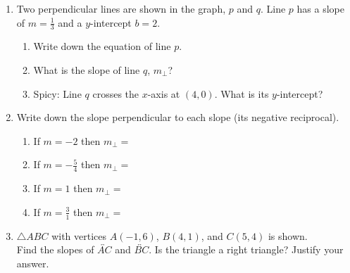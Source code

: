 \documentclass[12pt, twoside]{article}
\begin{document}
\begin{enumerate}
\newpage
\item Two perpendicular lines are shown in the graph, $p$ and $q$. Line $p$ has a slope of $\displaystyle m = \frac{1}{3}$ and a $y$-intercept $b=2$.
\begin{multicols}{2}
    \begin{enumerate}[itemsep=1cm]
      \item Write down the equation of line $p$.
      \item What is the slope of line $q$, $m_\perp$?
      \item Spicy: Line $q$ crosses the $x$-axis at $(4,0)$. What is its $y$-intercept?
      \end{enumerate}
    \begin{flushright}
    \end{flushright}
\end{multicols}

\newpage
\item Write down the slope perpendicular to each slope (its negative reciprocal).
\begin{enumerate}[itemsep=0.9cm]
  \item If $m = -2$ then $m_{\perp}=$
  \item If $\displaystyle m = -\frac{5}{4}$ then $m_{\perp}=$
  \item If $m = 1$ then $m_{\perp}=$
  \item If $\displaystyle m = \frac{3}{1}$ then $m_{\perp}=$
\end{enumerate}

\newpage
\item $\triangle ABC$ with vertices $A(-1,6)$, $B(4,1)$, and $C(5,4)$ is shown. \\[0.5cm]
Find the slopes of $\overleftrightarrow{AC}$ and $\overleftrightarrow{BC}$. Is the triangle a right triangle? Justify your answer.
  \begin{flushright}
    \end{flushright}


\end{enumerate}
\end{document}
